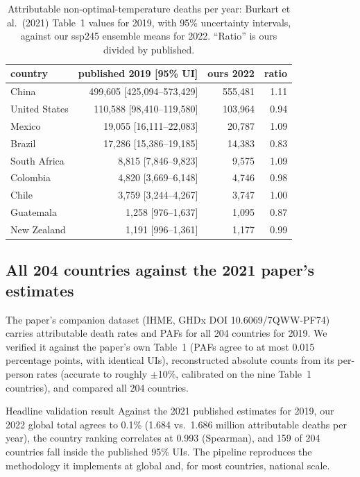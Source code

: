 \documentclass[11pt]{ozreport}
\begin{document}
\begin{table}[b]
\centering
\small
\begin{tabular}{lrrr}
\hline
country & published 2019 [95\% UI] & ours 2022 & ratio \\
\hline
China          & 499{,}605 [425{,}094--573{,}429] & 555{,}481 & 1.11 \\
United States  & 110{,}588 [98{,}410--119{,}580]  & 103{,}964 & 0.94 \\
Mexico         & 19{,}055 [16{,}111--22{,}083]    & 20{,}787  & 1.09 \\
Brazil         & 17{,}286 [15{,}386--19{,}185]    & 14{,}383  & 0.83 \\
South Africa   & 8{,}815 [7{,}846--9{,}823]       & 9{,}575   & 1.09 \\
Colombia       & 4{,}820 [3{,}669--6{,}148]       & 4{,}746   & 0.98 \\
Chile          & 3{,}759 [3{,}244--4{,}267]       & 3{,}747   & 1.00 \\
Guatemala      & 1{,}258 [976--1{,}637]           & 1{,}095   & 0.87 \\
New Zealand    & 1{,}191 [996--1{,}361]           & 1{,}177   & 0.99 \\
\hline
\end{tabular}
\caption{Attributable non-optimal-temperature deaths per year: Burkart et
al.\ (2021) Table~1 values for 2019, with 95\% uncertainty intervals, against
our ssp245 ensemble means for 2022. ``Ratio'' is ours divided by published.}
\label{tab:nine}
\end{table}

\subsection{All 204 countries against the 2021 paper's estimates}

The paper's companion dataset (IHME, GHDx DOI 10.6069/7QWW-PF74) carries
attributable death rates and PAFs for all 204 countries for 2019. We verified
it against the paper's own Table~1 (PAFs agree to at most 0.015 percentage
points, with identical UIs), reconstructed absolute counts from its
per-person rates (accurate to roughly $\pm$10\%, calibrated on the nine
Table~1 countries), and compared all 204 countries.

\begin{ozresult}{Headline validation result}
Against the 2021 published estimates for 2019, our 2022 global total agrees
to 0.1\% (1.684 vs.\ 1.686 million attributable deaths per year), the
country ranking correlates at 0.993 (Spearman), and 159 of 204 countries
fall inside the published 95\% UIs. The pipeline reproduces the methodology
it implements at global and, for most countries, national scale.
\end{ozresult}
\end{document}
